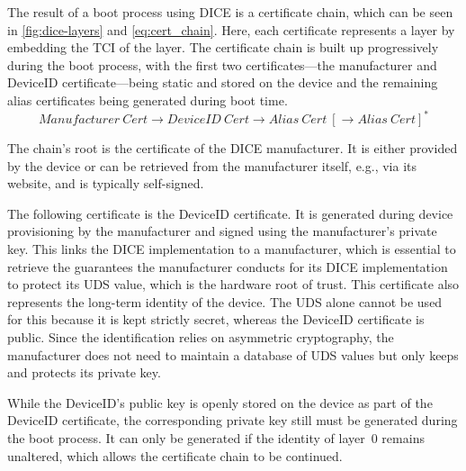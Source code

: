 
The result of a boot process using \ac{DICE} is a certificate chain, which can be seen in \autoref{fig:dice-layers} and \autoref{eq:cert_chain}.
Here, each certificate represents a layer by embedding the \ac{TCI} of the layer.
The certificate chain is built up progressively during the boot process, with the first two certificates---the manufacturer and DeviceID certificate---being static and stored on the device and the remaining alias certificates being generated during boot time.
\begin{equation}
  \label{eq:cert_chain}
  Manufacturer\ Cert \rightarrow DeviceID\ Cert \rightarrow Alias\ Cert\ [\rightarrow Alias\ Cert]^*
\end{equation}

The chain's root is the certificate of the DICE manufacturer.
It is either provided by the device or can be retrieved from the manufacturer itself, e.g., via its website, and is typically self-signed.




The following certificate is the DeviceID certificate.
It is generated during device provisioning by the manufacturer and signed using the manufacturer's private key.
This links the \ac{DICE} implementation to a manufacturer, which is essential to retrieve the guarantees the manufacturer conducts for its \ac{DICE} implementation to protect its \ac{UDS} value, which is the hardware root of trust.
This certificate also represents the long-term identity of the device.
The \ac{UDS} alone cannot be used for this because it is kept strictly secret, whereas the DeviceID certificate is public.
Since the identification relies on asymmetric cryptography, the manufacturer does not need to maintain a database of \ac{UDS} values but only keeps and protects its private key.


While the DeviceID's public key is openly stored on the device as part of the DeviceID certificate, the corresponding private key still must be generated during the boot process.
It can only be generated if the identity of layer~0 remains unaltered, which allows the certificate chain to be continued.

